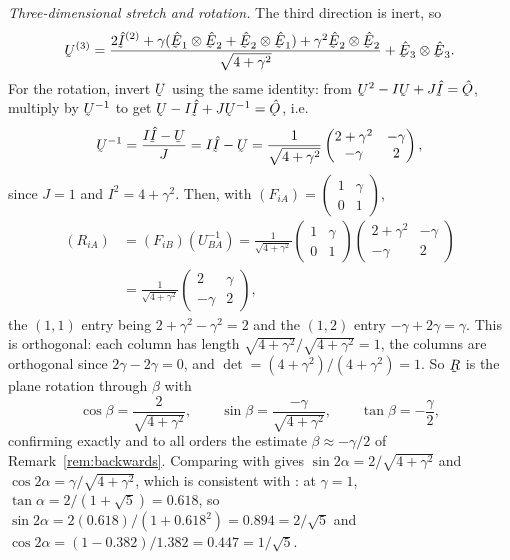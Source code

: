 \begin{solution}
\emph{Three-dimensional stretch and rotation.} The third direction is
inert, so
\[
   \bU^{(3)}=\frac{2\hI^{(2)}+\gamma(\hbE_{1}\otimes\hbE_{2}
     +\hbE_{2}\otimes\hbE_{1})+\gamma^{2}\hbE_{2}\otimes\hbE_{2}}
     {\sqrt{4+\gamma^{2}}}+\hbE_{3}\otimes\hbE_{3}.
\]
For the rotation, invert $\bU$ using the same identity: from
$\bU^{2}-I\bU+J\hI=\hOb$, multiply by $\bU^{-1}$ to get
$\bU-I\hI+J\bU^{-1}=\hOb$, i.e.
\[
   \bU^{-1}=\frac{I\hI-\bU}{J}=I\hI-\bU
   =\frac{1}{\sqrt{4+\gamma^{2}}}
     \begin{pmatrix}2+\gamma^{2}&-\gamma\\ -\gamma&2\end{pmatrix},
\]
since $J=1$ and $I^{2}=4+\gamma^{2}$. Then, with
$(F_{iA})=\begin{pmatrix}1&\gamma\\ 0&1\end{pmatrix}$,
\[
\begin{aligned}
   (R_{iA})&=(F_{iB})(U^{-1}_{BA})
   =\frac{1}{\sqrt{4+\gamma^{2}}}
   \begin{pmatrix}1&\gamma\\ 0&1\end{pmatrix}
   \begin{pmatrix}2+\gamma^{2}&-\gamma\\ -\gamma&2\end{pmatrix}\\
   &=\frac{1}{\sqrt{4+\gamma^{2}}}
   \begin{pmatrix}2&\gamma\\ -\gamma&2\end{pmatrix},
\end{aligned}
\]
the $(1,1)$ entry being $2+\gamma^{2}-\gamma^{2}=2$ and the $(1,2)$ entry
$-\gamma+2\gamma=\gamma$. This is orthogonal: each column has length
$\sqrt{4+\gamma^{2}}/\sqrt{4+\gamma^{2}}=1$, the columns are orthogonal
since $2\gamma-2\gamma=0$, and $\det=(4+\gamma^{2})/(4+\gamma^{2})=1$. So
$\bR$ is the plane rotation through $\beta$ with
\[
   \cos\beta=\frac{2}{\sqrt{4+\gamma^{2}}},\qquad
   \sin\beta=\frac{-\gamma}{\sqrt{4+\gamma^{2}}},\qquad
   \tan\beta=-\frac{\gamma}{2},
\]
confirming exactly and to all orders the estimate $\beta\approx-\gamma/2$
of Remark~\ref{rem:backwards}. Comparing with  gives
$\sin2\alpha=2/\sqrt{4+\gamma^{2}}$ and
$\cos2\alpha=\gamma/\sqrt{4+\gamma^{2}}$, which is consistent with
: at $\gamma=1$, $\tan\alpha=2/(1+\sqrt5)=0.618$, so
$\sin2\alpha=2(0.618)/(1+0.618^{2})=0.894=2/\sqrt5$ and
$\cos2\alpha=(1-0.382)/1.382=0.447=1/\sqrt5$.


\end{solution}

